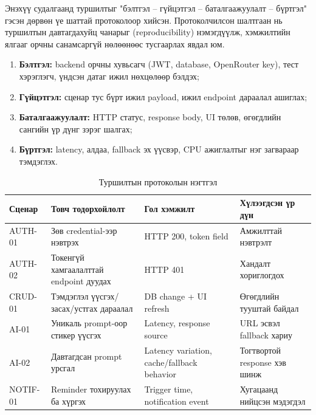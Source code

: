 Энэхүү судалгаанд туршилтыг "бэлтгэл -- гүйцэтгэл -- баталгаажуулалт -- бүртгэл" гэсэн дөрвөн үе шаттай протоколоор хийсэн. Протоколчилсон шалтгаан нь туршилтын давтагдахуйц чанарыг (reproducibility) нэмэгдүүлж, хэмжилтийн ялгааг орчны санамсаргүй нөлөөнөөс тусгаарлах явдал юм.

\begin{enumerate}
    \item \textbf{Бэлтгэл:} backend орчны хувьсагч (JWT, database, OpenRouter key), тест хэрэглэгч, үндсэн датаг ижил нөхцөлөөр бэлдэх;
    \item \textbf{Гүйцэтгэл:} сценар тус бүрт ижил payload, ижил endpoint дараалал ашиглах;
    \item \textbf{Баталгаажуулалт:} HTTP статус, response body, UI төлөв, өгөгдлийн сангийн үр дүнг зэрэг шалгах;
    \item \textbf{Бүртгэл:} latency, алдаа, fallback эх үүсвэр, CPU ажиглалтыг нэг загвараар тэмдэглэх.
\end{enumerate}

\begin{table}[H]
\centering
\caption{Туршилтын протоколын нэгтгэл}
\label{tab:test_protocol_summary}
\small
\setlength{\tabcolsep}{4pt}
\renewcommand{\arraystretch}{1.15}
\begin{tabularx}{\textwidth}{>{\raggedright\arraybackslash}p{2.0cm}>{\raggedright\arraybackslash}X>{\raggedright\arraybackslash}p{3.0cm}>{\raggedright\arraybackslash}p{2.4cm}}
\toprule
\textbf{Сценар} & \textbf{Товч тодорхойлолт} & \textbf{Гол хэмжилт} & \textbf{Хүлээгдсэн үр дүн} \\
\midrule
AUTH-01 & Зөв credential-ээр нэвтрэх & HTTP 200, token field & Амжилттай нэвтрэлт \\
AUTH-02 & Токенгүй хамгаалалттай endpoint дуудах & HTTP 401 & Хандалт хориглогдох \\
CRUD-01 & Тэмдэглэл үүсгэх/засах/устгах дараалал & DB change + UI refresh & Өгөгдлийн тууштай байдал \\
AI-01 & Уникаль prompt-оор стикер үүсгэх & Latency, response source & URL эсвэл fallback хариу \\
AI-02 & Давтагдсан prompt урсгал & Latency variation, cache/fallback behavior & Тогтвортой response хэв шинж \\
NOTIF-01 & Reminder тохируулах ба хүргэх & Trigger time, notification event & Хугацаанд нийцсэн мэдэгдэл \\
\bottomrule
\end{tabularx}
\normalsize
\end{table}


